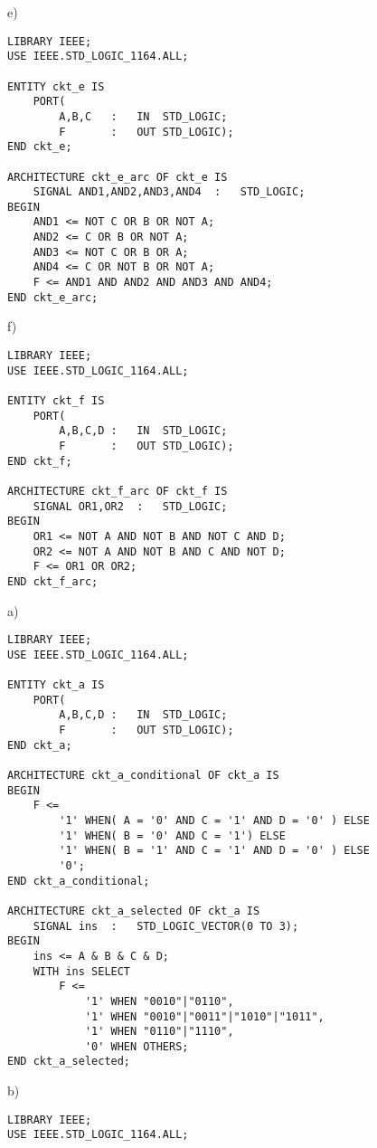 \begin{enumerate}
	\begin{minipage}{1\linewidth}
		e)
		\begin{lstlisting}[]
LIBRARY IEEE;
USE IEEE.STD_LOGIC_1164.ALL;

ENTITY ckt_e IS
	PORT(
		A,B,C	:	IN	STD_LOGIC;
		F		:	OUT	STD_LOGIC);
END ckt_e;

ARCHITECTURE ckt_e_arc OF ckt_e IS
	SIGNAL AND1,AND2,AND3,AND4	:	STD_LOGIC;
BEGIN
	AND1 <= NOT C OR B OR NOT A;
	AND2 <= C OR B OR NOT A;
	AND3 <= NOT C OR B OR A;
	AND4 <= C OR NOT B OR NOT A;
	F <= AND1 AND AND2 AND AND3 AND AND4;
END ckt_e_arc;
		\end{lstlisting}
	\end{minipage}

	\begin{minipage}{1\linewidth}
		f)
		\begin{lstlisting}[]
LIBRARY IEEE;
USE IEEE.STD_LOGIC_1164.ALL;

ENTITY ckt_f IS
	PORT(
		A,B,C,D	:	IN	STD_LOGIC;
		F		:	OUT	STD_LOGIC);
END ckt_f;

ARCHITECTURE ckt_f_arc OF ckt_f IS
	SIGNAL OR1,OR2	:	STD_LOGIC;
BEGIN
	OR1 <= NOT A AND NOT B AND NOT C AND D;
	OR2 <= NOT A AND NOT B AND C AND NOT D;
	F <= OR1 OR OR2;
END ckt_f_arc;
		\end{lstlisting}
	\end{minipage}

	\begin{minipage}{1\linewidth}
	\item a)
		\begin{lstlisting}
LIBRARY IEEE;
USE IEEE.STD_LOGIC_1164.ALL;

ENTITY ckt_a IS
	PORT(
		A,B,C,D	:	IN	STD_LOGIC;
		F		:	OUT	STD_LOGIC);
END ckt_a;

ARCHITECTURE ckt_a_conditional OF ckt_a IS
BEGIN
	F <=
		'1' WHEN( A = '0' AND C = '1' AND D = '0' ) ELSE
		'1' WHEN( B = '0' AND C = '1') ELSE
		'1' WHEN( B = '1' AND C = '1' AND D = '0' ) ELSE
		'0';
END ckt_a_conditional;

ARCHITECTURE ckt_a_selected OF ckt_a IS
	SIGNAL ins	:	STD_LOGIC_VECTOR(0 TO 3);
BEGIN
	ins <= A & B & C & D;
	WITH ins SELECT
		F <=
			'1' WHEN "0010"|"0110",
			'1' WHEN "0010"|"0011"|"1010"|"1011",
			'1' WHEN "0110"|"1110",
			'0' WHEN OTHERS;
END ckt_a_selected;
		\end{lstlisting}
	\end{minipage}

	\begin{minipage}{1\linewidth}
		b)
		\begin{lstlisting}
LIBRARY IEEE;
USE IEEE.STD_LOGIC_1164.ALL;


\end{lstlisting}
\end{minipage}
\end{enumerate}
